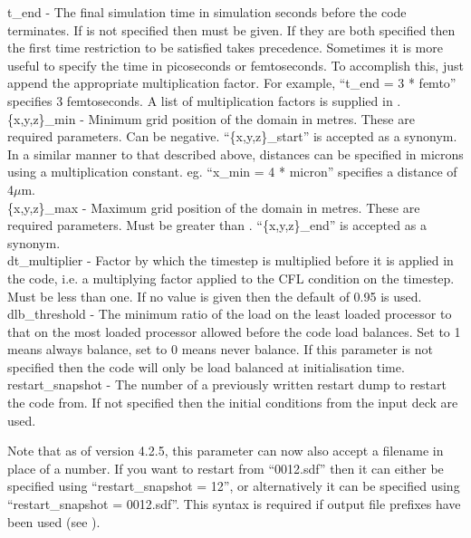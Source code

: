 {\emphtext t\_end} - The final simulation time in simulation seconds before the
code terminates. If  is not specified then
 must be given. If they are both specified then
the first time restriction to be satisfied takes precedence. Sometimes it is
more useful to specify the time in picoseconds or femtoseconds. To accomplish
this, just append the appropriate multiplication factor. For example,
``t\_end = 3 * femto'' specifies 3 femtoseconds. A list of multiplication
factors is supplied in .\\

{\emphtext \{x,y,z\}\_min} - Minimum grid position of the domain in
metres. These are required parameters. Can be negative. ``\{x,y,z\}\_start''
is accepted as a synonym. In a similar manner to that described above,
distances can be specified in microns using a multiplication constant.
eg. ``x\_min = 4 * micron'' specifies a distance of 4$\mu$m.\\

{\emphtext \{x,y,z\}\_max} - Maximum grid position of the domain in
metres. These are required parameters. Must be greater than
.  ``\{x,y,z\}\_end'' is accepted as a synonym.\\

{\emphtext dt\_multiplier} - Factor by which the timestep is multiplied before
it is applied in the code, i.e. a multiplying factor applied to the CFL
condition on the timestep. Must be less than one. If no value is given then
the default of 0.95 is used.\\

{\emphtext dlb\_threshold} - The minimum ratio of the
load on the least loaded processor to that on the most loaded processor allowed
before the code load balances. Set to 1 means
always balance, set to 0 means never balance. If this parameter is not
specified then the code will only be load balanced at initialisation time.\\

{\emphtext restart\_snapshot} - The number of a previously written restart
dump to restart the code from. If not specified then the initial conditions
from the input deck are used.

Note that as of version 4.2.5, this parameter can now also accept a filename
in place of a number.
If you want to restart from ``0012.sdf'' then it can either be
specified using ``restart\_snapshot = 12'', or alternatively it can be
specified using ``restart\_snapshot = 0012.sdf''. This syntax is required
if output file prefixes have been used (see ).\\

